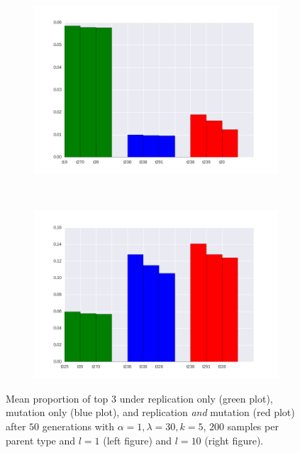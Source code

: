 \documentclass[a4paper]{article}
\begin{document}
%
\begin{figure}[h!]
  \centering
  \begin{subfigure}[b]{0.45\textwidth}
    \includegraphics[scale=0.4]{../code-LOT-extension/plots/rmd-l30-a1-k5-l1-meFalse432.png}
  \end{subfigure}
  ~
   \begin{subfigure}[b]{0.45\textwidth}
    \includegraphics[scale=0.4]{../code-LOT-extension/plots/rmd-l30-a1-k5-l10-meFalse432.png}
  \end{subfigure}
  \caption{Mean proportion of top $3$ under replication only (green plot), mutation only (blue plot), and replication {\em and} mutation (red plot) after $50$ generations with $\alpha = 1, \lambda = 30, k = 5$, $200$ samples per parent type and $l = 1$ (left figure) and $l = 10$ (right figure).}
  \label{fig:outcomes}
\end{figure}
%
\end{document}
